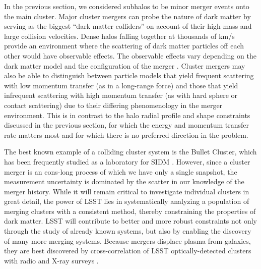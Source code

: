 In the previous section, we considered subhalos to be minor merger events onto the main cluster.  Major cluster mergers can probe the nature of dark matter by serving as the biggest ``dark matter colliders'' on account of their high mass and large collision velocities. Dense halos falling together at thousands of km/s provide an environment where the scattering of dark matter particles off each other would have observable effects.  The observable effects vary depending on the dark matter model and the configuration of the merger \citep{Kim:2016ujt}.  %
Cluster mergers may also be able to distinguish between particle models that yield frequent scattering with low momentum transfer (as in a long-range force) and those that yield infrequent scattering with high momentum transfer (as with hard sphere or contact scattering) due to their differing phenomenology in the merger environment.  This is in contrast to the halo radial profile and shape constraints discussed in the previous section, for which the energy and momentum transfer rate matters most and for which there is no preferred direction in the problem.

The best known example of a colliding cluster system is the Bullet Cluster, which has been frequently studied as a laboratory for SIDM \citep{Randall:2007ph,2017MNRAS.465..569R}. 
However, since a cluster merger is an eons-long process of which we have only a single snapshot, the measurement uncertainty is dominated by the scatter in our knowledge of the merger history. While it will remain critical to investigate individual clusters in great detail, the power of LSST lies in systematically analyzing a population of merging clusters with a consistent method, thereby constraining the properties of dark matter.
LSST will contribute to better and more robust constraints not only through the study of already known systems, but also by enabling the discovery of many more merging systems. Because mergers displace plasma from galaxies, they are best discovered by cross-correlation of LSST optically-detected clusters with radio and X-ray surveys \citep{Golovich:2018,Wilber2018}.

